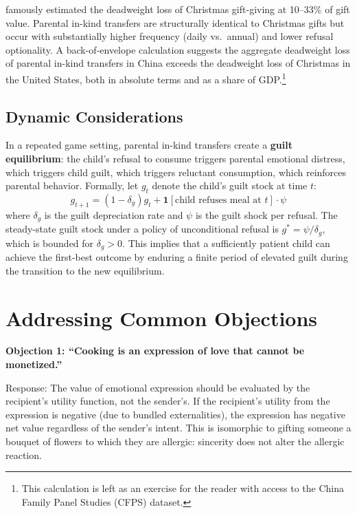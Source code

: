 \documentclass[AER]{AEA}
\begin{document}
\citet{waldfogel1993} famously estimated the deadweight loss of Christmas gift-giving at 10--33\% of gift value. Parental in-kind transfers are structurally identical to Christmas gifts but occur with substantially higher frequency (daily vs.\ annual) and lower refusal optionality. A back-of-envelope calculation suggests the aggregate deadweight loss of parental in-kind transfers in China exceeds the deadweight loss of Christmas in the United States, both in absolute terms and as a share of GDP.\footnote{This calculation is left as an exercise for the reader with access to the China Family Panel Studies (CFPS) dataset.}

\subsection{Dynamic Considerations}

In a repeated game setting, parental in-kind transfers create a \textbf{guilt equilibrium}: the child's refusal to consume triggers parental emotional distress, which triggers child guilt, which triggers reluctant consumption, which reinforces parental behavior. Formally, let $g_t$ denote the child's guilt stock at time $t$:
\begin{equation}
g_{t+1} = (1-\delta_g) g_t + \mathbf{1}[\text{child refuses meal at } t] \cdot \psi
\end{equation}
where $\delta_g$ is the guilt depreciation rate and $\psi$ is the guilt shock per refusal. The steady-state guilt stock under a policy of unconditional refusal is $g^* = \psi / \delta_g$, which is bounded for $\delta_g > 0$. This implies that a sufficiently patient child can achieve the first-best outcome by enduring a finite period of elevated guilt during the transition to the new equilibrium.

\section{Addressing Common Objections}\label{sec:objections}

\textbf{Objection 1: ``Cooking is an expression of love that cannot be monetized.''}

Response: The value of emotional expression should be evaluated by the recipient's utility function, not the sender's. If the recipient's utility from the expression is negative (due to bundled externalities), the expression has negative net value regardless of the sender's intent. This is isomorphic to gifting someone a bouquet of flowers to which they are allergic: sincerity does not alter the allergic reaction.
\end{document}

